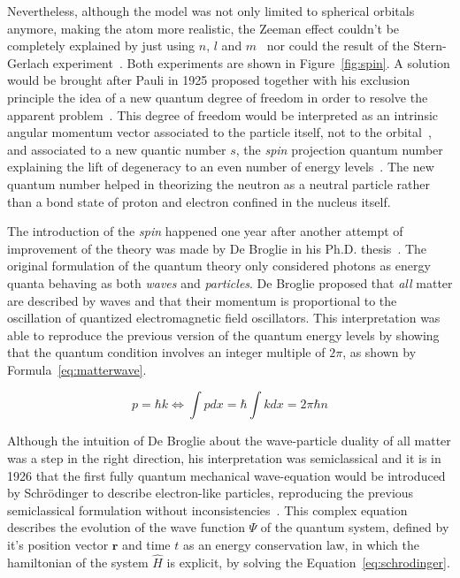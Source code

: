	Nevertheless, although the model was not only limited to spherical orbitals anymore, making the atom more realistic, the Zeeman effect couldn't be completely explained by just using $n$, $l$ and $m$~\cite{ZEEMAN431897,ZEEMAN441897I,ZEEMAN441897II,ZEEMAN451898} nor could the result of the Stern-Gerlach experiment~\cite{GERLACH1922}. Both experiments are shown in Figure~\ref{fig:spin}. A solution would be brought after Pauli in 1925 proposed together with his exclusion principle the idea of a new quantum degree of freedom in order to resolve the apparent problem~\cite{PAULI1925I,PAULI1925II}. This degree of freedom would be interpreted as an intrinsic angular momentum vector associated to the particle itself, not to the orbital~\cite{UHLENBECK1926}, and associated to a new quantic number $s$, the \textit{spin} projection quantum number explaining the lift of degeneracy to an even number of energy levels~\cite{PAULI1927}. The new quantum number helped in theorizing the neutron as a neutral particle rather than a bond state of proton and electron confined in the nucleus itself.
	
	The introduction of the \textit{spin} happened one year after another attempt of improvement of the theory was made by De Broglie in his Ph.D. thesis~\cite{DEBROGLIE1924}. The original formulation of the quantum theory only considered photons as energy quanta behaving as both \textit{waves} and \textit{particles}. De Broglie proposed that \textit{all} matter are described by waves and that their momentum is proportional to the oscillation of quantized electromagnetic field oscillators. This interpretation was able to reproduce the previous version of the quantum energy levels by showing that the quantum condition involves an integer multiple of $2\pi$, as shown by Formula~\ref{eq:matterwave}.
	
	\begin{equation}
		\label{eq:matterwave}
		p = \hbar k \Leftrightarrow \int p dx = \hbar\int k dx = 2\pi\hbar n
	\end{equation}
	
	Although the intuition of De Broglie about the wave-particle duality of all matter was a step in the right direction, his interpretation was semiclassical and it is in 1926 that the first fully quantum mechanical wave-equation would be introduced by Schrödinger to describe electron-like particles, reproducing the previous semiclassical formulation without inconsistencies~\cite{SCHRODINGER1926}. This complex equation describes the evolution of the wave function $\Psi$ of the quantum system, defined by it's position vector $\mathbf{r}$ and time $t$ as an energy conservation law, in which the hamiltonian of the system $\hat{H}$ is explicit, by solving the Equation~\ref{eq:schrodinger}.
	
